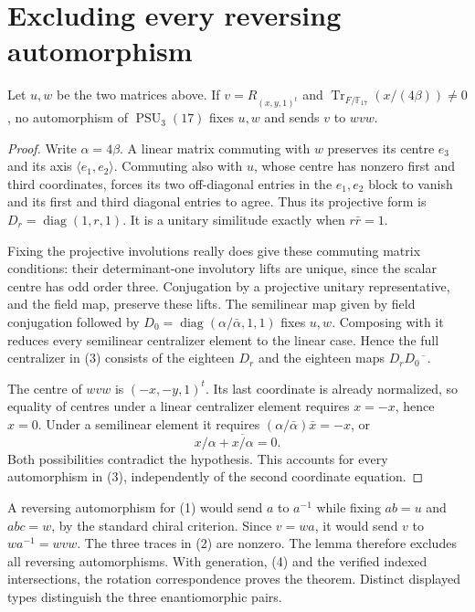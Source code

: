\documentclass[11pt]{article}
\newcommand{\F}{\mathbb F}\newcommand{\gen}[1]{\langle#1\rangle}
\begin{document}
\section*{Excluding every reversing automorphism}
\begin{lemma}
Let $u,w$ be the two matrices above. If $v=R_{(x,y,1)^t}$ and
$\operatorname{Tr}_{F/\F_{17}}(x/(4\beta))\ne0$, no automorphism
of $\operatorname{PSU}_3(17)$ fixes $u,w$ and sends $v$ to $wvw$.
\end{lemma}
\begin{proof}
Write $\alpha=4\beta$. A linear matrix commuting with $w$ preserves
its centre $e_3$ and its axis $\gen{e_1,e_2}$. Commuting also with
$u$, whose centre has nonzero first and third coordinates, forces
its two off-diagonal entries in the $e_1,e_2$ block to vanish and
its first and third diagonal entries to agree. Thus its projective
form is $D_r=\operatorname{diag}(1,r,1)$. It is a unitary similitude
exactly when $r\bar r=1$.

Fixing the projective involutions really does give these commuting
matrix conditions: their determinant-one involutory lifts are unique,
since the scalar centre has odd order three. Conjugation by a projective
unitary representative, and the field map, preserve these lifts.
The semilinear map given by field conjugation followed by
$D_0=\operatorname{diag}(\alpha/\bar\alpha,1,1)$ fixes $u,w$.
Composing with it reduces every semilinear centralizer element to the
linear case. Hence the full centralizer in (3) consists of the eighteen
$D_r$ and the eighteen maps $D_rD_0\overline{\phantom{x}}$.

The centre of $wvw$ is $(-x,-y,1)^t$. Its last coordinate is already
normalized, so equality of centres under a linear centralizer element
requires $x=-x$, hence $x=0$. Under a semilinear element it requires
$(\alpha/\bar\alpha)\bar x=-x$, or
\[
              x/\alpha+\overline{x/\alpha}=0.
\]
Both possibilities contradict the hypothesis. This accounts for every
automorphism in (3), independently of the second coordinate equation.
\end{proof}

A reversing automorphism for (1) would send $a$ to $a^{-1}$ while
fixing $ab=u$ and $abc=w$, by the standard chiral criterion.
Since $v=wa$, it would send $v$ to $wa^{-1}=wvw$.
The three traces in (2) are nonzero. The lemma therefore excludes all
reversing automorphisms. With generation, (4) and the verified indexed
intersections, the rotation correspondence proves the theorem.
Distinct displayed types distinguish the three enantiomorphic pairs.
\end{document}
